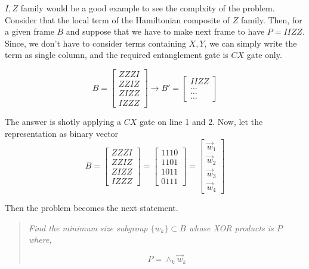\documentclass[a4paper,12pt]{article}
\begin{document}
$I, Z$ family would be a good example to see the complxity
of the problem.
Consider that the local term of the Hamiltonian composite of $Z$ family.
Then, for a given frame $B$ and suppose that we have to make next frame to have $P = IIZZ$.
Since, we don't have to consider terms containing $X, Y$, we can simply write the term 
as single column, and the required entanglement gate is $CX$ gate only.

\begin{equation}
    B = \begin{bmatrix}
        ZZZI\\
        ZZIZ\\
        ZIZZ\\
        IZZZ
    \end{bmatrix}
    \rightarrow B' = \begin{bmatrix}
        IIZZ\\
        \dots\\
        \dots\\
        \dots
    \end{bmatrix}
\end{equation}


The answer is shotly applying a $CX$ gate on line 1 and 2.
Now, let the representation as binary vector
\begin{equation}
B = \begin{bmatrix}
    ZZZI\\
    ZZIZ\\
    ZIZZ\\
    IZZZ
\end{bmatrix} = \begin{bmatrix}
    1110\\
    1101\\
    1011\\
    0111
\end{bmatrix} = 
\begin{bmatrix}
    \vec{w}_1\\
    \vec{w}_2\\
    \vec{w}_3\\
    \vec{w}_4
\end{bmatrix}
\end{equation}

Then the problem becomes the next statement.

\begin{quotation}
    \textit{Find the minimum size subgroup $\{w_k\} \subset B$ whose XOR products is $P$
    where, }

    \begin{equation}
        P = \wedge_{k} \vec{w}_k 
    \end{equation}

\end{quotation}
\end{document}
